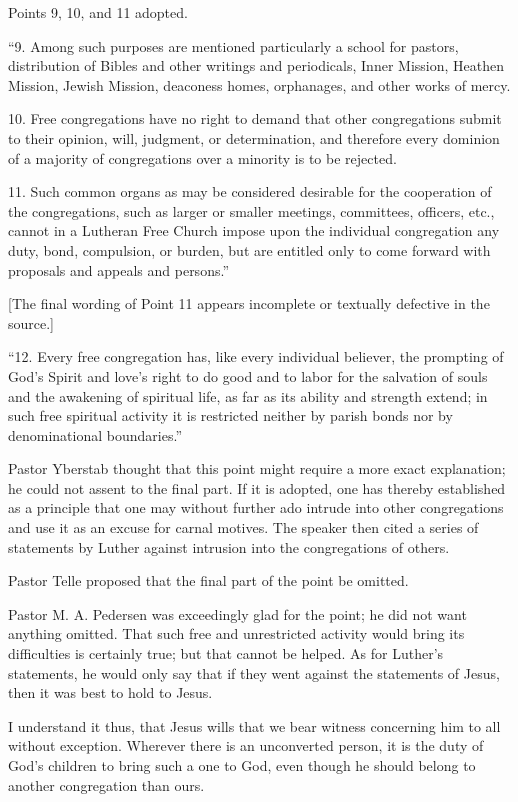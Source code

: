 Points 9, 10, and 11 adopted.

“9. Among such purposes are mentioned particularly a school for pastors, distribution of Bibles and other writings and periodicals, Inner Mission, Heathen Mission, Jewish Mission, deaconess homes, orphanages, and other works of mercy.

10. Free congregations have no right to demand that other congregations submit to their opinion, will, judgment, or determination, and therefore every dominion of a majority of congregations over a minority is to be rejected.

11. Such common organs as may be considered desirable for the cooperation of the congregations, such as larger or smaller meetings, committees, officers, etc., cannot in a Lutheran Free Church impose upon the individual congregation any duty, bond, compulsion, or burden, but are entitled only to come forward with proposals and appeals and persons.”

[The final wording of Point 11 appears incomplete or textually defective in the source.]

“12. Every free congregation has, like every individual believer, the prompting of God’s Spirit and love’s right to do good and to labor for the salvation of souls and the awakening of spiritual life, as far as its ability and strength extend; in such free spiritual activity it is restricted neither by parish bonds nor by denominational boundaries.”

Pastor Yberstab thought that this point might require a more exact explanation; he could not assent to the final part. If it is adopted, one has thereby established as a principle that one may without further ado intrude into other congregations and use it as an excuse for carnal motives. The speaker then cited a series of statements by Luther against intrusion into the congregations of others.

Pastor Telle proposed that the final part of the point be omitted.

Pastor M. A. Pedersen was exceedingly glad for the point; he did not want anything omitted. That such free and unrestricted activity would bring its difficulties is certainly true; but that cannot be helped. As for Luther’s statements, he would only say that if they went against the statements of Jesus, then it was best to hold to Jesus.

I understand it thus, that Jesus wills that we bear witness concerning him to all without exception. Wherever there is an unconverted person, it is the duty of God’s children to bring such a one to God, even though he should belong to another congregation than ours.

